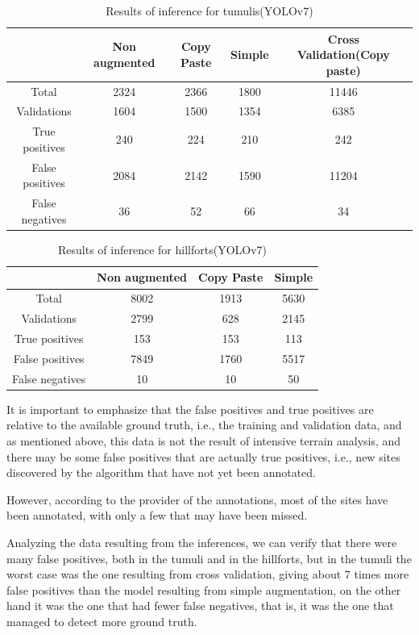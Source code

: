 \begin{table}[h!]
\centering
\begin{tabular}{|c c c c c|} 
 \hline
  & Non augmented  & Copy Paste & Simple & Cross Validation(Copy paste) \\ [0.5ex] 
 \hline\hline
 Total & 2324 & 2366 & 1800 & 11446 \\ 
 Validations & 1604 & 1500 & 1354 & 6385 \\
 True positives & 240 & 224 & 210 & 242 \\
 False positives & 2084 & 2142 & 1590 & 11204 \\
 False negatives & 36 & 52 & 66 & 34 \\ [1ex] 
 \hline
\end{tabular}
\caption{Results of inference for tumulis(YOLOv7)}
\label{Results of inference for tumulis(YOLOv7)}
\end{table}

\begin{table}[H]
\centering
\begin{tabular}{|c c c c|} 
 \hline
  & Non augmented  & Copy Paste & Simple \\ [0.5ex] 
 \hline\hline
 Total & 8002 & 1913 & 5630 \\ 
 Validations & 2799 & 628 & 2145\\
 True positives & 153 & 153 & 113 \\
 False positives & 7849 & 1760 & 5517 \\
 False negatives & 10 & 10 & 50\\ [1ex] 
 \hline
\end{tabular}
\caption{Results of inference for hillforts(YOLOv7)}
\label{Results of inference for hillforts(YOLOv7)}
\end{table}
It is important to emphasize that the false positives and true positives are relative to the available ground truth, i.e., the training and validation data, and as mentioned above, this data is not the result of intensive terrain analysis, and there may be some false positives that are actually true positives, i.e., new sites discovered by the algorithm that have not yet been annotated.

However, according to the provider of the annotations, most of the sites have been annotated, with only a few that may have been missed.

Analyzing the data resulting from the inferences, we can verify that there were many false positives, both in the tumuli and in the hillforts, but in the tumuli the worst case was the one resulting from cross validation, giving about 7 times more false positives than the model resulting from simple augmentation, on the other hand it was the one that had fewer false negatives, that is, it was the one that managed to detect more ground truth.

